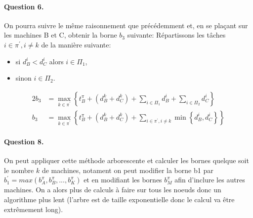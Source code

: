 \documentclass[a4paper, 10pt]{article}
\begin{document}
		\paragraph{Question 6.}{On pourra suivre le même raisonnement que précédemment et, en se plaçant sur les machines B et C, obtenir la borne $b_3$ suivante:
                  Répartissons les tâches $i \in \pi^\prime, i \ne k$ de la manière suivante:
		\begin{itemize}
			\item si $d^i_B < d^i_C$ alors $i \in \Pi_1$,
			\item sinon $i \in \Pi_2$.
		\end{itemize}
		\begin{alignat*}{2}
			b_3 &= \max_{k \in \pi^\prime} \left\{ t^{\pi}_B + \left( d^k_B + d^k_C \right) + \sum_{i \in \Pi_1} d^i_B + \sum_{i \in \Pi_2} d^i_C \right\} \\
			b_3 &= \max_{k \in \pi^\prime} \left\{ t^{\pi}_B + \left( d^k_B + d^k_C \right) + \sum_{i \in \pi^\prime, i \ne k} \min \left\{ d^i_B, d^i_C \right\} \right\}
		\end{alignat*}
		}
		
		\paragraph{Question 8.}{On peut appliquer cette méthode arborescente et calculer les bornes quelque soit le nombre $k$ de machines, notament on peut modifier la borne b1 par $b_1^\prime = max(b^{\pi}_A, b^{\pi}_B,...,b^{\pi}_K)$ et en modifiant les bornes $b^{\pi}_M$ afin d'inclure les autres machines. On a alors plus de calculs à faire sur tous les noeuds donc un algorithme plus lent (l'arbre est de taille exponentielle donc le calcul va être extrêmement long).
		}
\end{document}

